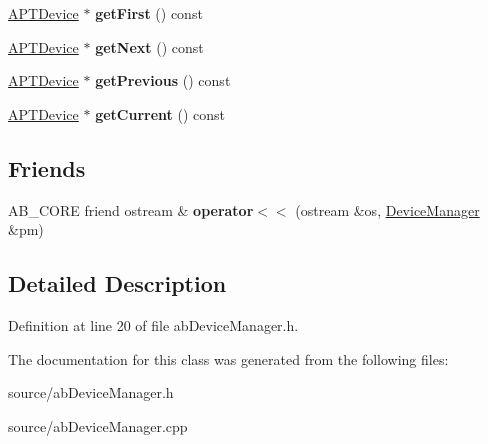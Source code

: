 \begin{DoxyCompactItemize}
\item 
\hyperlink{class_a_p_t_device}{A\+P\+T\+Device} $\ast$ {\bfseries get\+First} () const \hypertarget{class_device_manager_a87d4bd700cd87b0b5b0e9a974536137f}{}\label{class_device_manager_a87d4bd700cd87b0b5b0e9a974536137f}

\item 
\hyperlink{class_a_p_t_device}{A\+P\+T\+Device} $\ast$ {\bfseries get\+Next} () const \hypertarget{class_device_manager_aa8a9e2b99c7ba69d85786b1be5f899c0}{}\label{class_device_manager_aa8a9e2b99c7ba69d85786b1be5f899c0}

\item 
\hyperlink{class_a_p_t_device}{A\+P\+T\+Device} $\ast$ {\bfseries get\+Previous} () const \hypertarget{class_device_manager_a9abe7a53a853fcc620ebd489d685a17d}{}\label{class_device_manager_a9abe7a53a853fcc620ebd489d685a17d}

\item 
\hyperlink{class_a_p_t_device}{A\+P\+T\+Device} $\ast$ {\bfseries get\+Current} () const \hypertarget{class_device_manager_ac1738a2162299622e41764bef8ee7bd7}{}\label{class_device_manager_ac1738a2162299622e41764bef8ee7bd7}

\end{DoxyCompactItemize}
\subsection*{Friends}
\begin{DoxyCompactItemize}
\item 
A\+B\+\_\+\+C\+O\+RE friend ostream \& {\bfseries operator$<$$<$} (ostream \&os, \hyperlink{class_device_manager}{Device\+Manager} \&pm)\hypertarget{class_device_manager_aeac7252d4c4a31b9b427e75bd730b59a}{}\label{class_device_manager_aeac7252d4c4a31b9b427e75bd730b59a}

\end{DoxyCompactItemize}


\subsection{Detailed Description}


Definition at line 20 of file ab\+Device\+Manager.\+h.



The documentation for this class was generated from the following files\+:\begin{DoxyCompactItemize}
\item 
source/ab\+Device\+Manager.\+h\item 
source/ab\+Device\+Manager.\+cpp\end{DoxyCompactItemize}
